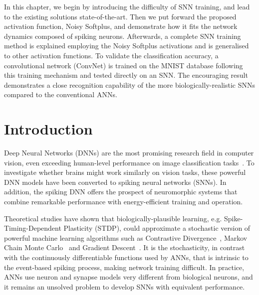 In this chapter, we begin by introducing the difficulty of SNN training, and lead to the existing solutions state-of-the-art.
Then we put forward the proposed activation function, Noisy Softplus, and demonstrate how it fits the network dynamics composed of spiking neurons.
Afterwards, a complete SNN training method is explained employing the Noisy Softplus activations and is generalised to other activation functions.
To validate the classification accuracy, a convolutional network (ConvNet) is trained on the MNIST database following this training mechanism and tested directly on an SNN.
The encouraging result demonstrates a close recognition capability of the more biologically-realistic SNNs compared to the conventional ANNs.

\section{Introduction}	
Deep Neural Networks (DNNs) are the most promising research field in computer vision, even exceeding human-level performance on image classification tasks~\cite{he2015delving}.
To investigate whether brains might work similarly on vision tasks, these powerful DNN models have been converted to spiking neural networks (SNNs).
In addition, the spiking DNN offers the prospect of neuromorphic systems that combine remarkable performance with energy-efficient training and operation.

Theoretical studies have shown that biologically-plausible learning, e.g. Spike-Timing-Dependent Plasticity (STDP), could approximate a stochastic version of powerful machine learning algorithms
such as 
Contrastive Divergence~\cite{neftci2013event}, Markov Chain Monte Carlo~\cite{buesing2011neural} and Gradient Descent~\cite{o2016deep}.
It is the stochasticity, in contrast with the continuously differentiable functions used by ANNs, that is intrinsic to the event-based spiking process, making network training difficult.
In practice, ANNs use neuron and synapse models very different from biological neurons, and it remains an unsolved problem to develop SNNs with equivalent performance.

